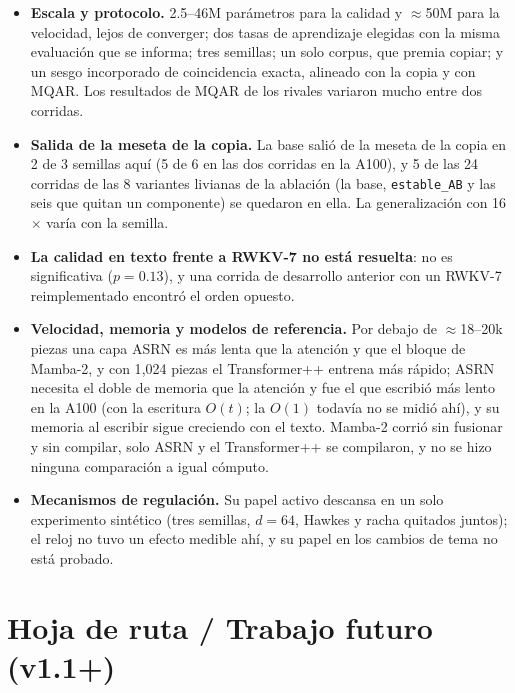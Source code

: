 \documentclass[11pt]{article}
\begin{document}
\begin{itemize}
\item \textbf{Escala y protocolo.} 2.5--46M parámetros para la calidad y $\approx$50M para la velocidad, lejos de
  converger; dos tasas de aprendizaje elegidas con la misma evaluación que se informa; tres semillas; un solo corpus,
  que premia copiar; y un sesgo incorporado de coincidencia exacta, alineado con la copia y con MQAR. Los resultados de
  MQAR de los rivales variaron mucho entre dos corridas.
\item \textbf{Salida de la meseta de la copia.} La base salió de la meseta de la copia en 2 de 3 semillas aquí (5 de 6
  en las dos corridas en la A100), y 5 de las 24 corridas de las 8 variantes livianas de la ablación (la base,
  \texttt{estable\_AB} y las seis que quitan un componente) se quedaron en ella. La generalización con 16$\times$ varía
  con la semilla.
\item \textbf{La calidad en texto frente a RWKV-7 no está resuelta}: no es significativa ($p=0.13$), y una corrida de
  desarrollo anterior con un RWKV-7 reimplementado encontró el orden opuesto.
\item \textbf{Velocidad, memoria y modelos de referencia.} Por debajo de $\approx$18--20k piezas una capa ASRN es más
  lenta que la atención y que el bloque de Mamba-2, y con 1{,}024 piezas el Transformer++ entrena más rápido; ASRN
  necesita el doble de memoria que la atención y fue el que escribió más lento en la A100 (con la escritura $O(t)$; la
  $O(1)$ todavía no se midió ahí), y su memoria al escribir sigue creciendo con el texto. Mamba-2 corrió sin fusionar
  y sin compilar, solo ASRN y el Transformer++ se compilaron, y no se hizo ninguna comparación a igual cómputo.
\item \textbf{Mecanismos de regulación.} Su papel activo descansa en un solo experimento sintético (tres semillas,
  $d=64$, Hawkes y racha quitados juntos); el reloj no tuvo un efecto medible ahí, y su papel en los cambios de tema no
  está probado.
\end{itemize}

\section{Hoja de ruta / Trabajo futuro (v1.1+)}
\label{sec:future}
\end{document}
